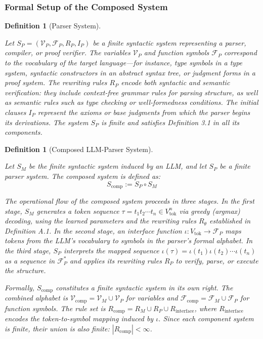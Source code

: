 \documentclass[11pt]{article}
\newtheorem{definition}[theorem]{Definition}
\begin{document}
\subsubsection{Formal Setup of the Composed System}

\begin{definition}[Parser System]
\label{def:parser_system}

Let $S_P = (\mathcal{V}_P, \mathcal{F}_P, R_P, I_P)$ be a finite syntactic system representing a parser, compiler, or proof verifier. The variables $\mathcal{V}_P$ and function symbols $\mathcal{F}_P$ correspond to the vocabulary of the target language—for instance, type symbols in a type system, syntactic constructors in an abstract syntax tree, or judgment forms in a proof system. The rewriting rules $R_P$ encode both syntactic and semantic verification: they include context-free grammar rules for parsing structure, as well as semantic rules such as type checking or well-formedness conditions. The initial clauses $I_P$ represent the axioms or base judgments from which the parser begins its derivations. The system $S_P$ is finite and satisfies Definition 3.1 in all its components.

\end{definition}

\begin{definition}[Composed LLM-Parser System]
\label{def:composed_system}

Let $S_M$ be the finite syntactic system induced by an LLM, and let $S_P$ be a finite parser system. The composed system is defined as:
\begin{equation}
S_{\text{comp}} := S_P \circ S_M
\end{equation}

The operational flow of the composed system proceeds in three stages. In the first stage, $S_M$ generates a token sequence $\tau = t_1 t_2 \cdots t_n \in V_{\text{tok}}^n$ via greedy (argmax) decoding, using the learned parameters and the rewriting rules $R_\theta$ established in Definition A.1. In the second stage, an interface function $\iota: V_{\text{tok}} \to \mathcal{F}_P$ maps tokens from the LLM's vocabulary to symbols in the parser's formal alphabet. In the third stage, $S_P$ interprets the mapped sequence $\iota(\tau) = \iota(t_1) \iota(t_2) \cdots \iota(t_n)$ as a sequence in $\mathcal{F}_P^*$ and applies its rewriting rules $R_P$ to verify, parse, or execute the structure.

Formally, $S_{\text{comp}}$ constitutes a finite syntactic system in its own right. The combined alphabet is $\mathcal{V}_{\text{comp}} = \mathcal{V}_M \cup \mathcal{V}_P$ for variables and $\mathcal{F}_{\text{comp}} = \mathcal{F}_M \cup \mathcal{F}_P$ for function symbols. The rule set is $R_{\text{comp}} = R_M \cup R_P \cup R_{\text{interface}}$, where $R_{\text{interface}}$ encodes the token-to-symbol mapping induced by $\iota$. Since each component system is finite, their union is also finite: $|R_{\text{comp}}| < \infty$.

\end{definition}
\end{document}
